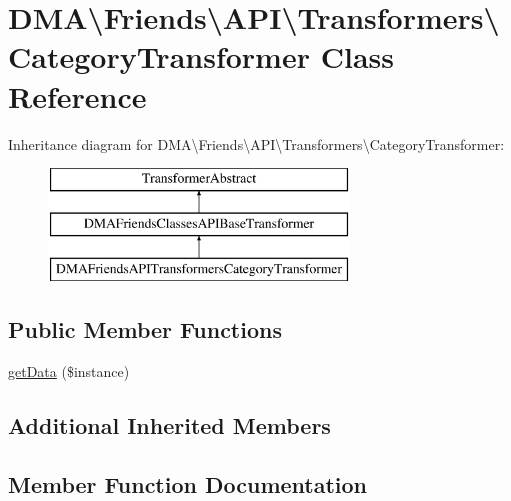 \hypertarget{classDMA_1_1Friends_1_1API_1_1Transformers_1_1CategoryTransformer}{}\section{D\+M\+A\textbackslash{}Friends\textbackslash{}A\+P\+I\textbackslash{}Transformers\textbackslash{}Category\+Transformer Class Reference}
\label{classDMA_1_1Friends_1_1API_1_1Transformers_1_1CategoryTransformer}
Inheritance diagram for D\+M\+A\textbackslash{}Friends\textbackslash{}A\+P\+I\textbackslash{}Transformers\textbackslash{}Category\+Transformer\+:\begin{figure}[H]
\begin{center}
\leavevmode
\includegraphics[height=3.000000cm]{dd/d14/classDMA_1_1Friends_1_1API_1_1Transformers_1_1CategoryTransformer}
\end{center}
\end{figure}
\subsection*{Public Member Functions}
\begin{DoxyCompactItemize}
\item 
\hyperlink{classDMA_1_1Friends_1_1API_1_1Transformers_1_1CategoryTransformer_a67f413e3b721931ff37c26a51b108e61}{get\+Data} (\$instance)
\end{DoxyCompactItemize}
\subsection*{Additional Inherited Members}


\subsection{Member Function Documentation}
\hypertarget{classDMA_1_1Friends_1_1API_1_1Transformers_1_1CategoryTransformer_a67f413e3b721931ff37c26a51b108e61}{}
